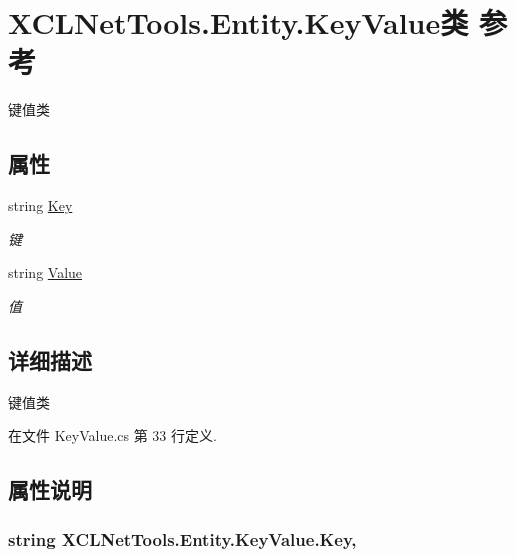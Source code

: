 \hypertarget{class_x_c_l_net_tools_1_1_entity_1_1_key_value}{\section{X\-C\-L\-Net\-Tools.\-Entity.\-Key\-Value类 参考}
\label{class_x_c_l_net_tools_1_1_entity_1_1_key_value}
}


键值类  


\subsection*{属性}
\begin{DoxyCompactItemize}
\item 
string \hyperlink{class_x_c_l_net_tools_1_1_entity_1_1_key_value_a33e2f7bfdcc6a1dce560304a4450cf08}{Key}
\begin{DoxyCompactList}\small\item\em 键 \end{DoxyCompactList}\item 
string \hyperlink{class_x_c_l_net_tools_1_1_entity_1_1_key_value_a9ec3c76143930f64c1e0de2074514bae}{Value}
\begin{DoxyCompactList}\small\item\em 值 \end{DoxyCompactList}\end{DoxyCompactItemize}


\subsection{详细描述}
键值类 



在文件 Key\-Value.\-cs 第 33 行定义.



\subsection{属性说明}
\hypertarget{class_x_c_l_net_tools_1_1_entity_1_1_key_value_a33e2f7bfdcc6a1dce560304a4450cf08}{
\subsubsection[{Key}]{\setlength{\rightskip}{0pt plus 5cm}string X\-C\-L\-Net\-Tools.\-Entity.\-Key\-Value.\-Key\hspace{0.3cm}{\ttfamily [get]}, {\ttfamily [set]}}}\label{class_x_c_l_net_tools_1_1_entity_1_1_key_value_a33e2f7bfdcc6a1dce560304a4450cf08}


